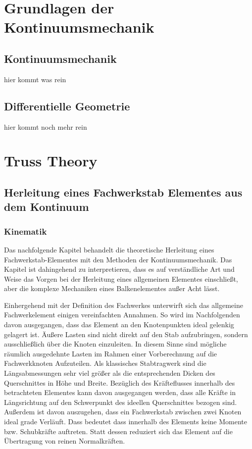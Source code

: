 \documentclass[german,a4paper,12pt,oneside]{scrbook}
\theoremstyle{definition}
\theoremstyle{definition}
\theoremstyle{definition}
\theoremstyle{definition}
\theoremstyle{definition}
\theoremstyle{definition}
\begin{document}

\chapter{Grundlagen der Kontinuumsmechanik}
\section{Kontinuumsmechanik}
hier kommt was rein

\section{Differentielle Geometrie}
hier kommt noch mehr rein

\chapter{Truss Theory}  \setcounter{page}{1}   %




\section{Herleitung eines Fachwerkstab Elementes aus dem Kontinuum}
\subsection{Kinematik}

Das nachfolgende Kapitel behandelt die theoretische Herleitung eines Fachwerkstab-Elementes mit den Methoden der Kontinuumsmechanik. Das Kapitel ist dahingehend zu interpretieren, dass es auf verständliche Art und Weise das Vorgen bei der Herleitung eines allgemeinen Elementes einschließt, aber die komplexe Mechaniken eines Balkenelementes außer Acht lässt.

Einhergehend mit der Definition des Fachwerkes unterwirft sich das allgemeine Fachwerkelement einigen vereinfachten Annahmen. So wird im Nachfolgenden davon ausgegangen, dass das Element an den Knotenpunkten ideal gelenkig gelagert ist. Äußere Lasten sind nicht direkt auf den Stab aufzubringen, sondern ausschließlich über die Knoten einzuleiten. In diesem Sinne sind mögliche räumlich ausgedehnte Lasten im Rahmen einer Vorberechnung auf die Fachwerkknoten Aufzuteilen.  Als klassisches Stabtragwerk sind die Längsabmessungen sehr viel größer als die entsprechenden Dicken des Querschnittes in Höhe und Breite. Bezüglich des Kräfteflusses innerhalb des betrachteten Elementes kann davon ausgegangen werden, dass alle Kräfte in Längsrichtung auf den Schwerpunkt des ideellen Querschnittes bezogen sind. Außerdem ist davon auszugehen, dass ein Fachwerkstab zwischen zwei Knoten ideal grade Verläuft. Dass bedeutet dass innerhalb des Elements keine Momente bzw. Schubkräfte auftreten. Statt dessen reduziert sich das Element auf die Übertragung von reinen Normalkräften.
\end{document}
